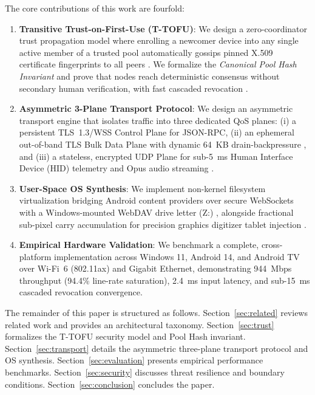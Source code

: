 \documentclass[conference]{IEEEtran}
\begin{document}
The core contributions of this work are fourfold:
\begin{enumerate}
    \item \textbf{Transitive Trust-on-First-Use (T-TOFU)}: We design a zero-coordinator trust propagation model where enrolling a newcomer device into any single active member of a trusted pool automatically gossips pinned X.509 certificate fingerprints to all peers \cite{li2025zerotrustd2d}. We formalize the \textit{Canonical Pool Hash Invariant} and prove that nodes reach deterministic consensus without secondary human verification, with fast cascaded revocation \cite{ahmed2025cascaded}.
    \item \textbf{Asymmetric 3-Plane Transport Protocol}: We design an asymmetric transport engine that isolates traffic into three dedicated QoS planes: (i) a persistent TLS~1.3/WSS Control Plane for JSON-RPC, (ii) an ephemeral out-of-band TLS Bulk Data Plane with dynamic 64~KB drain-backpressure \cite{liu2024dynamicflow}, and (iii) a stateless, encrypted UDP Plane for sub-5~ms Human Interface Device (HID) telemetry \cite{park2024latencyhid} and Opus audio streaming \cite{sharma2025opusstreaming}.
    \item \textbf{User-Space OS Synthesis}: We implement non-kernel filesystem virtualization bridging Android content providers over secure WebSockets with a Windows-mounted WebDAV drive letter (Z:) \cite{zhao2023caching}, alongside fractional sub-pixel carry accumulation for precision graphics digitizer tablet injection \cite{patel2025digitizer}.
    \item \textbf{Empirical Hardware Validation}: We benchmark a complete, cross-platform implementation across Windows 11, Android 14, and Android TV over Wi-Fi~6 (802.11ax) and Gigabit Ethernet, demonstrating 944~Mbps throughput (94.4\% line-rate saturation), 2.4~ms input latency, and sub-15~ms cascaded revocation convergence.
\end{enumerate}

The remainder of this paper is structured as follows. Section~\ref{sec:related} reviews related work and provides an architectural taxonomy. Section~\ref{sec:trust} formalizes the T-TOFU security model and Pool Hash invariant. Section~\ref{sec:transport} details the asymmetric three-plane transport protocol and OS synthesis. Section~\ref{sec:evaluation} presents empirical performance benchmarks. Section~\ref{sec:security} discusses threat resilience and boundary conditions. Section~\ref{sec:conclusion} concludes the paper.
\end{document}
